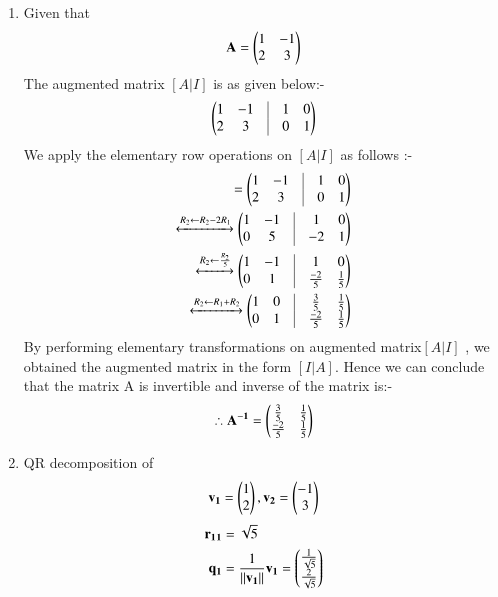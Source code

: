 \begin{enumerate}
    \item Given that
    \begin{align}
    \mathbf{A} = \begin{pmatrix}1 & -1 \\ 2 & 3\end{pmatrix}
    \end{align}
    The augmented matrix $ [A | I]$ is as given below:- 
    \begin{align}
    \myvec{1 & -1 & \vrule & 1 & 0 \\ 2 & 3 & \vrule & 0 & 1}
    \end{align}
    We apply the elementary row operations on $ [A | I]$ as follows :-
    \begin{align}
    [A | I] = \myvec{1 & -1 & \vrule & 1 & 0 \\ 2 & 3 & \vrule & 0 & 1}
    \\
    \xleftrightarrow{R_2\leftarrow R_2-2R_1}   
    \myvec{1 & -1 & \vrule & 1 & 0 \\ 0 & 5 & \vrule & -2 & 1}
    \\
    \xleftrightarrow{R_2\leftarrow \frac{R_2}{5}}
    \myvec{1 & -1 & \vrule & 1 & 0 \\ 0 & 1 & \vrule & \frac {-2}{5} & \frac {1}{5}}
    \\
    \xleftrightarrow{R_2\leftarrow R_1+R_2}
    \myvec{1 & 0 & \vrule & \frac{3}{5} & \frac{1}{5} \\ 0 & 1 & \vrule & \frac{-2}{5} & \frac{1}{5}}
    \end{align}
    By performing elementary transformations on augmented matrix$ [A | I]$ , we obtained the augmented matrix in the form $ [I | A]$. 
    Hence we can conclude that the matrix A is invertible and inverse of the matrix is:-
    \begin{align}
    \therefore\mathbf{A^{-1}}=\begin{pmatrix}\frac{3}{5} & \frac{1}{5} \\  \frac{-2}{5} & \frac{1}{5}\end{pmatrix} 
    \end{align}
    \item QR decomposition of  
    \begin{align}
    \mathbf{v_1}=\begin{pmatrix}1 \\ 2\end{pmatrix},
    \mathbf{v_2}=\begin{pmatrix}-1 \\ 3\end{pmatrix}
    \end{align}
    \begin{align}
    \vec{r_1{}_1}&=\sqrt{5}
    \\
    \vec{q_1}&=\frac{1}{\norm{\vec{v_1}}}{\vec{v_1}}=\myvec{\frac{1}{\sqrt{5}} \\ \frac{2}{\sqrt{5}}}

\end{align}
\end{enumerate}
